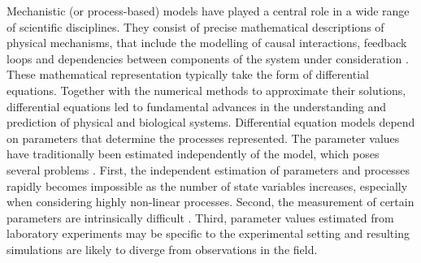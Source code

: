 
Mechanistic (or process-based) models have played a central role in a wide range of scientific disciplines. 
They consist of precise mathematical descriptions of physical mechanisms, that include the modelling of causal interactions, feedback loops and dependencies between components of the system under consideration \cite{rackauckas2020universal}. 
These mathematical representation typically take the form of differential equations. 
Together with the numerical methods to approximate their solutions, differential equations led to fundamental advances in the understanding and prediction of physical and biological systems.
Differential equation models depend on parameters that determine the processes represented. 
The parameter values have traditionally been estimated independently of the model, which poses several problems \cite{hartig2012}.
First, the independent estimation of parameters and processes rapidly becomes impossible as the number of state variables increases, especially when considering highly non-linear processes. 
Second, the measurement of certain parameters are intrinsically difficult \cite{Schartau2017}. Third, parameter values estimated from laboratory experiments may be specific to the experimental setting and resulting simulations are likely to diverge from observations in the field.

